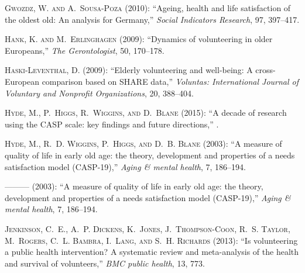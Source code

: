\documentclass[10pt, letterpaper]{article}
\begin{document}
\begin{spacing}{1.4}
\begin{thebibliography}{87}
\textsc{Gwozdz, W. and A.~Sousa-Poza} (2010): \enquote{Ageing, health and life
  satisfaction of the oldest old: An analysis for Germany,} \emph{Social
  Indicators Research}, 97, 397--417.

\textsc{Hank, K. and M.~Erlinghagen} (2009): \enquote{Dynamics of volunteering
  in older Europeans,} \emph{The Gerontologist}, 50, 170--178.

\textsc{Haski-Leventhal, D.} (2009): \enquote{Elderly volunteering and
  well-being: A cross-European comparison based on SHARE data,} \emph{Voluntas:
  International Journal of Voluntary and Nonprofit Organizations}, 20,
  388--404.

\textsc{Hyde, M., P.~Higgs, R.~Wiggins, and D.~Blane} (2015): \enquote{A decade
  of research using the CASP scale: key findings and future directions,} .

\textsc{Hyde, M., R.~D. Wiggins, P.~Higgs, and D.~B. Blane}
  (2003{}): \enquote{A measure of quality of life in early old age:
  the theory, development and properties of a needs satisfaction model
  (CASP-19),} \emph{Aging \& mental health}, 7, 186--194.

---\hspace{-.1pt}---\hspace{-.1pt}--- (2003{}): \enquote{A measure
  of quality of life in early old age: the theory, development and properties
  of a needs satisfaction model (CASP-19),} \emph{Aging \& mental health}, 7,
  186--194.

\textsc{Jenkinson, C.~E., A.~P. Dickens, K.~Jones, J.~Thompson-Coon, R.~S.
  Taylor, M.~Rogers, C.~L. Bambra, I.~Lang, and S.~H. Richards} (2013):
  \enquote{Is volunteering a public health intervention? A systematic review
  and meta-analysis of the health and survival of volunteers,} \emph{BMC public
  health}, 13, 773.


\end{thebibliography}
\end{spacing}
\end{document}
